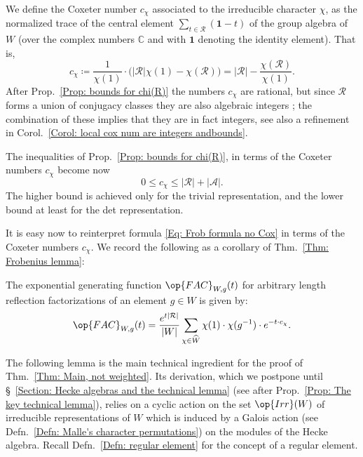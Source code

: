 \begin{defi}\label{Defn: Coxeter numbers}
We define the Coxeter number $c_{\chi}$ associated to the irreducible character $\chi$, as the normalized trace of the central element $\sum_{t\in\mathcal{R}}(\mathbf{1}-t)$ of the group algebra of $W$ (over the complex numbers $\mathbb{C}$	 and with $\mathbf{1}$ denoting the identity element). That is, $$c_{\chi}\coloneqq \dfrac{1}{\chi(1)}\cdot\big(|\mathcal{R}|\chi(1)-\chi(\mathcal{R})\big)=|\mathcal{R}|-\dfrac{\chi(\mathcal{R})}{\chi(1)}.$$ After Prop.~\ref{Prop: bounds for chi(R)} the numbers $c_{\chi}$ are rational, but since $\mathcal{R}$ forms a union of conjugacy classes they are also algebraic integers \cite[Corol.~1, p.~52]{Serre}; the combination of these implies that they are in fact integers, see also a refinement in Corol.~\ref{Corol: local cox num are integers andbounds}.
\end{defi}


\begin{rema}\label{Rem: bounds Coxeter nums}
The inequalities of Prop.~\ref{Prop: bounds for chi(R)}, in terms of the Coxeter numbers $c_{\chi}$ become now
\[
0\leq c_{\chi}\leq |\mathcal{R}|+|\mathcal{A}|.
\]
The higher bound is achieved only for the trivial representation, and the lower bound at least for the det representation.
\end{rema}


It is easy now to reinterpret formula \eqref{Eq: Frob formula no Cox} in terms of the Coxeter numbers $c_{\chi}$. We record the following as a corollary of Thm.~\ref{Thm: Frobenius lemma}:

\begin{coro}
The exponential generating function $\op{FAC}_{W,g}(t)$ for arbitrary length reflection factorizations of an element $g\in W$ is given by:\begin{equation}
\op{FAC}_{W,g}(t)=\dfrac{e^{t|\mathcal{R}|}}{|W|}\sum_{\chi\in\widehat{W}}\chi(1)\cdot \chi(g^{-1})\cdot e^{-t\cdot c_{\chi}}.\label{EQ: Frobenius via Coxeter numbers}\end{equation}
\end{coro}

The following lemma is the main technical ingredient for the proof of Thm.~\ref{Thm: Main, not weighted}. Its derivation, which we postpone until \S~\ref{Section: Hecke algebras and the technical lemma} (see after Prop.~\ref{Prop: The key technical lemma}), relies on a cyclic action on the set $\op{Irr}(W)$ of irreducible representations of $W$ which is induced by a Galois action (see Defn.~\ref{Defn: Malle's character permutations}) on the modules of the Hecke algebra. Recall Defn.~\ref{Defn: regular element} for the concept of a regular element.


